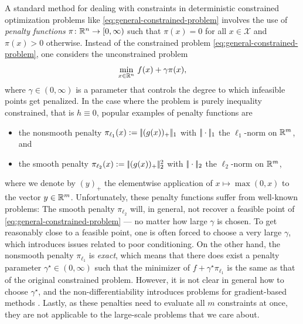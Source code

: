 A standard method for dealing with
constraints in
deterministic constrained optimization problems like
\eqref{eq:general-constrained-problem}
involves the use of \textit{penalty functions}
$\pi\colon\mathbb{R}^n\to[0,\infty)$ such that $\pi(x) = 0$ for all $x\in\mathcal{X}$ and $\pi(x) > 0$
otherwise.
Instead of the constrained problem \eqref{eq:general-constrained-problem}, one considers
the unconstrained problem
\[
    \min_{x\in\mathbb{R}^n} \, f(x) + \gamma \pi(x),
\]
where $\gamma\in(0,\infty)$ is a parameter that controls the degree to which infeasible points get penalized.
In the case where the problem is purely inequality constrained, that is $h\equiv 0$,
popular examples of penalty functions are
\begin{itemize}
    \item[-] the nonsmooth penalty $\pi_{\ell_1}(x) := |\!|(g(x))_+|\!|_1$ with $|\!|\cdot|\!|_1$ the $\ell_1$-norm on $\mathbb{R}^m$, and
    \item[-] the smooth penalty $\pi_{\ell_2}(x) := |\!|(g(x))_+|\!|_2^2$ with $|\!|\cdot|\!|_2$ the $\ell_2$-norm on $\mathbb{R}^m$,
\end{itemize}
where we denote by $(y)_+$ the elementwise application of $x\mapsto \max(0, x)$ to the vector $y\in\mathbb{R}^m$.
Unfortunately, these penalty functions suffer from well-known problems: The smooth penalty $\pi_{\ell_2}$ will, in general, not
recover a feasible point of \eqref{eq:general-constrained-problem} --- no matter how large $\gamma$
is chosen. To get reasonably close to a feasible point, one is often forced to
choose a very large $\gamma$, which introduces issues related to poor conditioning. On the other hand, the
nonsmooth penalty $\pi_{\ell_1}$ is \textit{exact}, which means that there does
exist a penalty parameter $\gamma^\star\in(0,\infty)$ such that the minimizer
of $f + \gamma^\star \pi_{\ell_1}$ is the same as that of the original constrained problem.
However, it is not clear in general how to choose $\gamma^\star$, and
the non-differentiability introduces problems for gradient-based methods \cite{nocedal2006numerical,bertsekas1997nonlinear}.
Lastly, as these penalties need to evaluate all $m$ constraints at once, they are not applicable
to the large-scale problems that we care about.


